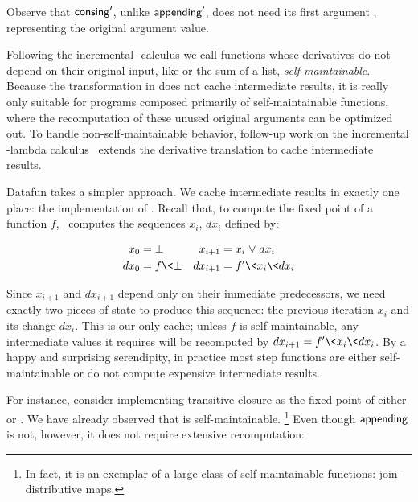 \noindent
Observe that $\text{\sffamily consing}'$, unlike $\text{\sffamily appending}'$, does not need its
first argument , representing the original argument value.

Following the incremental \fn-calculus we call functions whose derivatives do
not depend on their original input, like  or the sum of a
list, \emph{self-maintainable}.
%
Because the transformation in \citet{incremental} does not cache intermediate results, it is really only suitable for programs composed primarily of self-maintainable functions, where the recomputation of these unused original arguments can be optimized out.
%
%
To handle non-self-maintainable behavior, follow-up work on the incremental
\fn-lambda calculus~\citep{DBLP:conf/esop/GiarrussoRS19} extends the derivative
translation to cache intermediate results.
%

Datafun takes a simpler approach.
%
We cache intermediate results in exactly one place: the implementation of \semifix.
%
Recall that, to compute the fixed point of a function $f$, \semifix\ computes the sequences $x_i$, $dx_i$ defined by:

\begin{align*}
  x_0 &= \bot &
  x_{i + 1} &= x_i \vee dx_i\\
  dx_0 &= f \<\bot &
  dx_{i + 1} &= f' \<x_i \<dx_i
\end{align*}

\noindent
Since $x_{i + 1}$ and $dx_{i + 1}$ depend only on their immediate predecessors, we
need exactly two pieces of state to produce this sequence: the previous iteration $x_i$ and its change $dx_i$.
%
This is our only cache; unless $f$ is self-maintainable, any intermediate values it requires will be recomputed by $dx_{i + 1} = f' \<x_i \<dx_i$.
%
By a happy and surprising serendipity, in practice most step functions  are either self-maintainable or do not compute expensive intermediate results.

For instance, consider implementing transitive closure as the fixed point of either  or .
%
We have already observed that  is self-maintainable.%
%
\footnote{In fact, it is an exemplar of a large class of self-maintainable functions: join-distributive maps. 
%
}
%
Even though $\text{\sffamily appending}$ is not, however, it does not require extensive recomputation:


